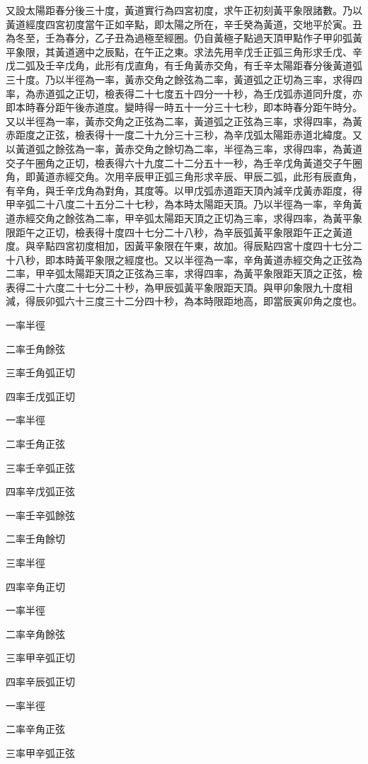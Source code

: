 \begin{pinyinscope}
又設太陽距春分後三十度，黃道實行為四宮初度，求午正初刻黃平象限諸數。乃以黃道經度四宮初度當午正如辛點，即太陽之所在，辛壬癸為黃道，交地平於寅。丑為冬至，壬為春分，乙子丑為過極至經圈。仍自黃極子點過天頂甲點作子甲卯弧黃平象限，其黃道適中之辰點，在午正之東。求法先用辛戊壬正弧三角形求壬戊、辛戊二弧及壬辛戊角，此形有戊直角，有壬角黃赤交角，有壬辛太陽距春分後黃道弧三十度。乃以半徑為一率，黃赤交角之餘弦為二率，黃道弧之正切為三率，求得四率，為赤道弧之正切，檢表得二十七度五十四分一十秒，為壬戊弧赤道同升度，亦即本時春分距午後赤道度。變時得一時五十一分三十七秒，即本時春分距午時分。又以半徑為一率，黃赤交角之正弦為二率，黃道弧之正弦為三率，求得四率，為黃赤距度之正弦，檢表得十一度二十九分三十三秒，為辛戊弧太陽距赤道北緯度。又以黃道弧之餘弦為一率，黃赤交角之餘切為二率，半徑為三率，求得四率，為黃道交子午圈角之正切，檢表得六十九度二十二分五十一秒，為壬辛戊角黃道交子午圈角，即黃道赤經交角。次用辛辰甲正弧三角形求辛辰、甲辰二弧，此形有辰直角，有辛角，與壬辛戊角為對角，其度等。以甲戊弧赤道距天頂內減辛戊黃赤距度，得甲辛弧二十八度二十五分二十七秒，為本時太陽距天頂。乃以半徑為一率，辛角黃道赤經交角之餘弦為二率，甲辛弧太陽距天頂之正切為三率，求得四率，為黃平象限距午之正切，檢表得十度四十七分二十八秒，為辛辰弧黃平象限距午正之黃道度。與辛點四宮初度相加，因黃平象限在午東，故加。得辰點四宮十度四十七分二十八秒，即本時黃平象限之經度也。又以半徑為一率，辛角黃道赤經交角之正弦為二率，甲辛弧太陽距天頂之正弦為三率，求得四率，為黃平象限距天頂之正弦，檢表得二十六度二十七分二十秒，為甲辰弧黃平象限距天頂。與甲卯象限九十度相減，得辰卯弧六十三度三十二分四十秒，為本時限距地高，即當辰寅卯角之度也。

一率半徑

二率壬角餘弦

三率壬角弧正切

四率壬戊弧正切

一率半徑

二率壬角正弦

三率壬辛弧正弦

四率辛戊弧正弦

一率壬辛弧餘弦

二率壬角餘切

三率半徑

四率辛角正切

一率半徑

二率辛角餘弦

三率甲辛弧正切

四率辛辰弧正切

一率半徑

二率辛角正弦

三率甲辛弧正弦


\end{pinyinscope}
